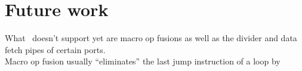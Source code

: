


\section{Future work}

What \suaca\ doesn't support yet are macro op fusions as well as the divider and data fetch pipes of certain ports.\\
Macro op fusion usually ``eliminates'' the last jump instruction of a loop by 